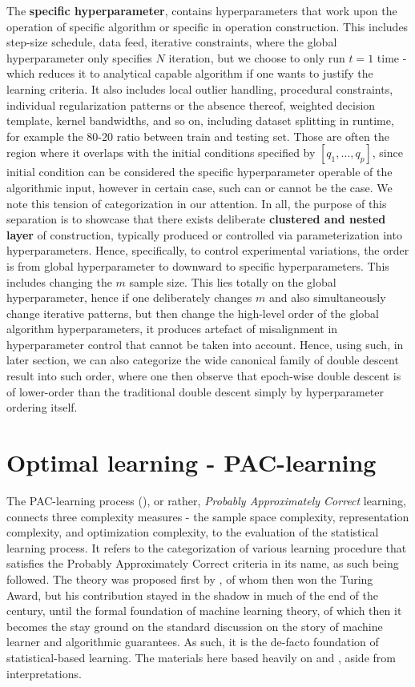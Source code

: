 The \textbf{specific hyperparameter}, contains hyperparameters that work upon the operation of specific algorithm or specific in operation construction. This includes step-size schedule, data feed, iterative constraints, where the global hyperparameter only specifies $N$ iteration, but we choose to only run $t=1$ time - which reduces it to analytical capable algorithm if one wants to justify the learning criteria. It also includes local outlier handling, procedural constraints, individual regularization patterns or the absence thereof, weighted decision template, kernel bandwidths, and so on, including dataset splitting in runtime, for example the 80-20 ratio between train and testing set. Those are often the region where it overlaps with the initial conditions specified by $[q_{1},\dots,q_{p}]$, since initial condition can be considered the specific hyperparameter operable of the algorithmic input, however in certain case, such can or cannot be the case. We note this tension of categorization in our attention. In all, the purpose of this separation is to showcase that there exists deliberate \textbf{clustered and nested layer} of construction, typically produced or controlled via parameterization into hyperparameters. Hence, specifically, to control experimental variations, the order is from global hyperparameter to downward to specific hyperparameters. This includes changing the $m$ sample size. This lies totally on the global hyperparameter, hence if one deliberately changes $m$ and also simultaneously change iterative patterns, but then change the high-level order of the global algorithm hyperparameters, it produces artefact of misalignment in hyperparameter control that cannot be taken into account. Hence, using such, in later section, we can also categorize the wide canonical family of double descent result into such order, where one then observe that epoch-wise double descent is of lower-order than the traditional double descent simply by hyperparameter ordering itself. 

\section{Optimal learning - PAC-learning}

The PAC-learning process (\cite{10.5555/2621980,10.5555/2371238,STL_Hajek_Maxim_2021}), or rather, \textit{Probably Approximately Correct} learning, connects three complexity measures - the sample space complexity, representation complexity, and optimization complexity, to the evaluation of the statistical learning process. It refers to the categorization of various learning procedure that satisfies the Probably Approximately Correct criteria in its name, as such being followed. The theory was proposed first by \cite{10.1145/1968.1972}, of whom then won the Turing Award, but his contribution stayed in the shadow in much of the end of the century, until the formal foundation of machine learning theory, of which then it becomes the stay ground on the standard discussion on the story of machine learner and algorithmic guarantees. As such, it is the de-facto foundation of statistical-based learning. The materials here based heavily on \cite{10.5555/2371238} and \cite{10.5555/200548}, aside from interpretations. 

